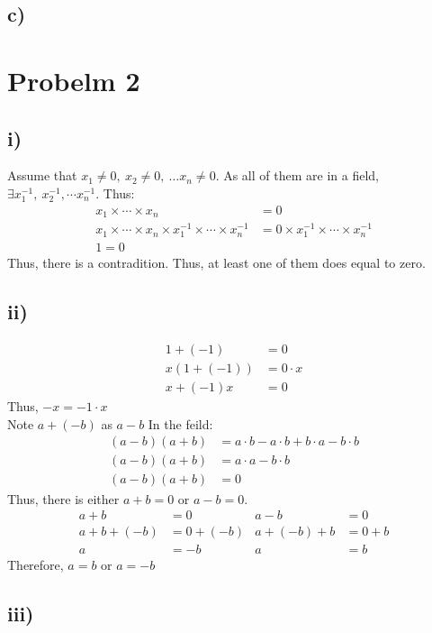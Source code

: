 \documentclass{article}
\begin{document}
\subsection*{c)}




\section*{Probelm 2}


\subsection*{i)}
Assume that \(x_1\neq 0,\ x_2\neq0,\ \dots x_n\neq0\). As all of them are in a field, 
\(\exists x_1^{-1},\ x_2^{-1},\cdots x_n^{-1}\). Thus:
\begin{align*}
    x_1\times \cdots \times x_n&=0\\
    x_1\times \cdots \times x_n\times x^{-1}_1\times \cdots \times x_n^{-1}&=0\times x^{-1}_1\times \cdots \times x_n^{-1}\\
    1=0
\end{align*}
Thus, there is a contradition. Thus, at least one of them does equal to zero.
\subsection*{ii)}
\begin{align*}
    1+(-1)&=0\\
    x(1+(-1))&=0\cdot x\\
    x+(-1)x &= 0
\end{align*}
Thus, \(-x = -1\cdot x\)\\
Note \(a+(-b)\) as \(a-b\)
In the feild:
\begin{align*}
    (a-b)(a+b)&=a\cdot b-a\cdot b +b\cdot a -b\cdot b\\
    (a-b)(a+b)&=a\cdot a - b\cdot b\\
    (a-b)(a+b)&=0
\end{align*}
Thus, there is either \(a+b=0\) or \(a-b = 0\).
\begin{align*}
    a+b&=0&a-b &= 0\\
    a+b+(-b)&=0+(-b)&a+(-b)+b&=0+b\\
    a&=-b&a&=b
\end{align*}
Therefore, \(a=b\) or \(a=-b\)
\subsection*{iii)}
\end{document}
